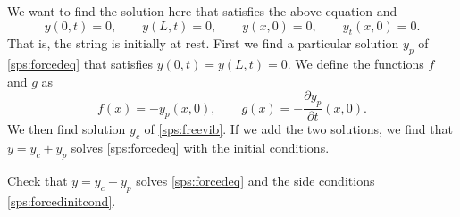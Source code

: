 We want to find the solution here that satisfies the above equation and
\begin{equation} \label{sps:forcedinitcond}
y(0,t) = 0, \qquad y(L,t) = 0, \qquad
y(x,0) = 0, \qquad y_t(x,0) = 0.
\end{equation}
That is, the string is initially at rest.  First we find a particular
solution $y_p$ of \eqref{sps:forcedeq} that satisfies
$y(0,t) = y(L,t) = 0$.  We define the functions $f$ and $g$ as
\begin{equation*}
f(x) = -y_p(x,0), \qquad g(x) = -\frac{\partial y_p}{\partial t} (x,0) .
\end{equation*}
We then find solution $y_c$ of \eqref{sps:freevib}.  If we add the two
solutions, we find that $y = y_c + y_p$ solves \eqref{sps:forcedeq} with
the initial conditions.

\begin{exercise}
Check that $y = y_c + y_p$ solves \eqref{sps:forcedeq} and the
side conditions \eqref{sps:forcedinitcond}.
\end{exercise}

